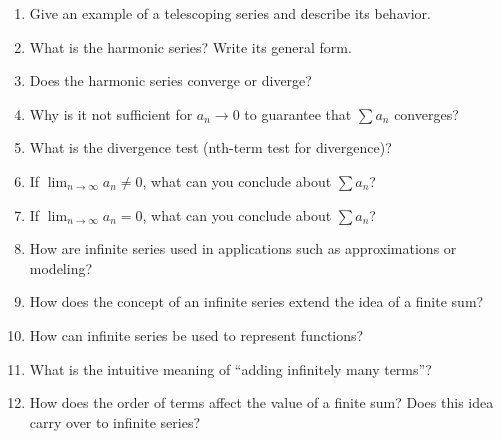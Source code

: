 \begin{enumerate}
  \item Give an example of a telescoping series and describe its behavior.
  \item What is the harmonic series? Write its general form.
  \item Does the harmonic series converge or diverge?
  \item Why is it not sufficient for $a_n \to 0$ to guarantee that $\sum a_n$ converges?
  \item What is the divergence test (nth-term test for divergence)?
  \item If $\lim_{n \to \infty} a_n \neq 0$, what can you conclude about $\sum a_n$?
  \item If $\lim_{n \to \infty} a_n = 0$, what can you conclude about $\sum a_n$?
  \item How are infinite series used in applications such as approximations or modeling?
  \item How does the concept of an infinite series extend the idea of a finite sum?
  \item How can infinite series be used to represent functions?
  \item What is the intuitive meaning of “adding infinitely many terms”?
  \item How does the order of terms affect the value of a finite sum? Does this idea carry over to infinite series?
\end{enumerate}
